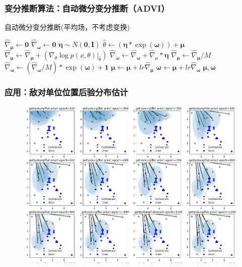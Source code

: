 \documentclass{beamer}
\begin{document}
\begin{frame}
\frametitle{变分推断算法：自动微分变分推断（ADVI）}

\begin{algorithm}[H]

\tiny

\caption{自动微分变分推断(平均场，不考虑变换)}
\begin{algorithmic}[1]
  
        \State $\hat{\nabla}_\mathbf{\mu} \gets \mathbf{0}$
        \State $\hat{\nabla}_\mathbf{\omega} \gets \mathbf{0}$
            \State $\mathbf{\eta} \sim N(\mathbf{0},\mathbf{I}) $ 
            \State $\hat{\theta} \gets (\mathbf{\eta} * \exp(\mathbf{\omega})) + \mathbf{\mu}$ 
            \State $\hat{\nabla}_\mathbf{\mu} \gets \hat{\nabla}_\mathbf{\mu} + (\nabla_\theta \log p(x,\theta)|_{\hat{\theta}})$
            \State $\hat{\nabla}_\mathbf{\omega} \gets \hat{\nabla}_\mathbf{\omega} + \hat{\nabla}_\mu * \mathbf{\eta}$
        \EndFor
        \State $\hat{\nabla}_{\mathbf{\mu}} \gets \hat{\nabla}_{\mathbf{\mu}} / M$
        \State $\hat{\nabla}_{\mathbf{\omega}} \gets (\hat{\nabla}_\mathbf{\omega} / M) * \exp(\mathbf{\omega}) + \mathbf{1}$
        \State $\mathbf{\mu} \gets \mathbf{\mu} + lr \hat{\nabla}_{\mathbf{\mu}}$
        \State $\mathbf{\omega} \gets \mathbf{\mu} + lr \hat{\nabla}_{\mathbf{\omega}}$
    \EndFor 
    \State \Return $\mathbf{\mu},\mathbf{\omega}$
\EndProcedure
\end{algorithmic}
\label{alg:advi}
\end{algorithm}

\end{frame}

\begin{frame}
\frametitle{应用：敌对单位位置后验分布估计}

\begin{figure}[htb]
\includegraphics[width=0.8\linewidth]{gettysburg-point-small.png}
\label{fig:gettysburgInit}
\end{figure}



\end{frame}
\end{document}
